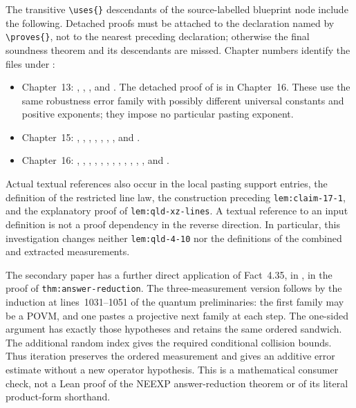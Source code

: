 \documentclass[11pt]{article}
\begin{document}
The transitive \verb|\uses{}| descendants of the source-labelled blueprint
node include the following. Detached proofs must be attached to the declaration
named by \verb|\proves{}|, not to the nearest preceding declaration;
otherwise the final soundness theorem and its descendants are missed.
Chapter numbers identify the files under :
\begin{itemize}
 \item Chapter~13: , ,
 , and . The detached proof
 of  is in Chapter~16. These use the same robustness error
 family with possibly different universal constants and positive exponents;
 they impose no particular pasting exponent.
 \item Chapter~15: ,
 ,
 , , ,
 , , and
 .
 \item Chapter~16: ,
 , ,
 , ,
 , ,
 ,
 ,
 , ,
 , and .
\end{itemize}
Actual textual references also occur in the local pasting support entries,
the definition of the restricted line law, the construction preceding
\texttt{lem:claim-17-1}, and the explanatory proof of
\texttt{lem:qld-xz-lines}. A textual reference to an input definition is
not a proof dependency in the reverse direction. In particular, this
investigation changes neither \texttt{lem:qld-4-10} nor the definitions of
the combined and extracted measurements.

The secondary paper has a further direct application of Fact~4.35, in
, in the proof
of \texttt{thm:answer-reduction}. The three-measurement version follows by
the induction at lines~1031--1051 of the quantum preliminaries: the first
family may be a POVM, and one pastes a projective next family at each step.
The one-sided argument has exactly those hypotheses and retains the same
ordered sandwich. The additional random index gives the required conditional
collision bounds. Thus iteration preserves the ordered measurement and gives
an additive error estimate without a new operator hypothesis. This is a
mathematical consumer check, not a Lean proof of the NEEXP answer-reduction
theorem or of its literal product-form shorthand.
\end{document}
